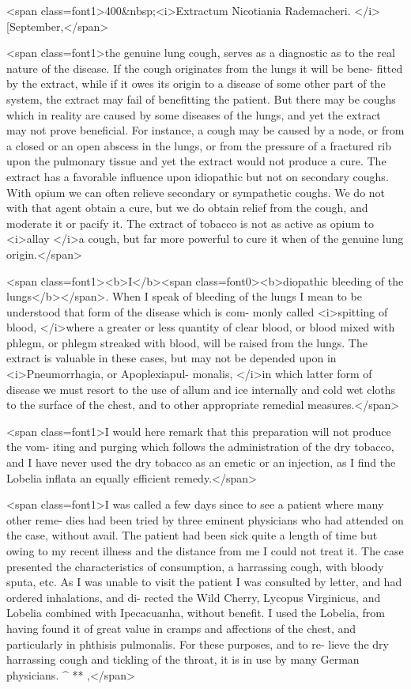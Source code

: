 <span class=font1>400&nbsp;<i>Extractum Nicotiania Rademacheri. </i>[September,</span>

<span class=font1>the genuine lung cough, serves as a diagnostic as to the real nature of
the disease. If the cough originates from the lungs it will be bene-
fitted by the extract, while if it owes its origin to a disease of some
other part of the system, the extract may fail of benefitting the
patient. But there may be coughs which in reality are caused by some
diseases of the lungs, and yet the extract may not prove beneficial.
For instance, a cough may be caused by a node, or from a closed or
an open abscess in the lungs, or from the pressure of a fractured rib
upon the pulmonary tissue and yet the extract would not produce a
cure. The extract has a favorable influence upon idiopathic but not
on secondary coughs. With opium we can often relieve secondary or
sympathetic coughs. We do not with that agent obtain a cure, but
we do obtain relief from the cough, and moderate it or pacify it. The
extract of tobacco is not as active as opium to <i>allay </i>a cough, but far
more powerful to cure it when of the genuine lung origin.</span>

<span class=font1><b>I</b><span class=font0><b>diopathic bleeding of the lungs</b></span>. When I speak of bleeding of the
lungs I mean to be understood that form of the disease which is com-
monly called <i>spitting of blood, </i>where a greater or less quantity of clear
blood, or blood mixed with phlegm, or phlegm streaked with blood,
will be raised from the lungs. The extract is valuable in these cases,
but may not be depended upon in <i>Pneumorrhagia, or Apoplexiapul-
monalis, </i>in which latter form of disease we must resort to the use of
allum and ice internally and cold wet cloths to the surface of the
chest, and to other appropriate remedial measures.</span>

<span class=font1>I would here remark that this preparation will not produce the vom-
iting and purging which follows the administration of the dry tobacco,
and I have never used the dry tobacco as an emetic or an injection, as I
find the Lobelia inflata an equally efficient remedy.</span>

<span class=font1>I was called a few days since to see a patient where many other reme-
dies had been tried by three eminent physicians who had attended on
the case, without avail. The patient had been sick quite a length of
time but owing to my recent illness and the distance from me I could
not treat it. The case presented the characteristics of consumption, a
harrassing cough, with bloody sputa, etc. As I was unable to visit the
patient I was consulted by letter, and had ordered inhalations, and di-
rected the Wild Cherry, Lycopus Virginicus, and Lobelia combined
with Ipecacuanha, without benefit. I used the Lobelia, from having
found it of great value in cramps and affections of the chest, and
particularly in phthisis pulmonalis. For these purposes, and to re-
lieve the dry harrassing cough and tickling of the throat, it is in use
by many German physicians.    ^ ** ,</span>
